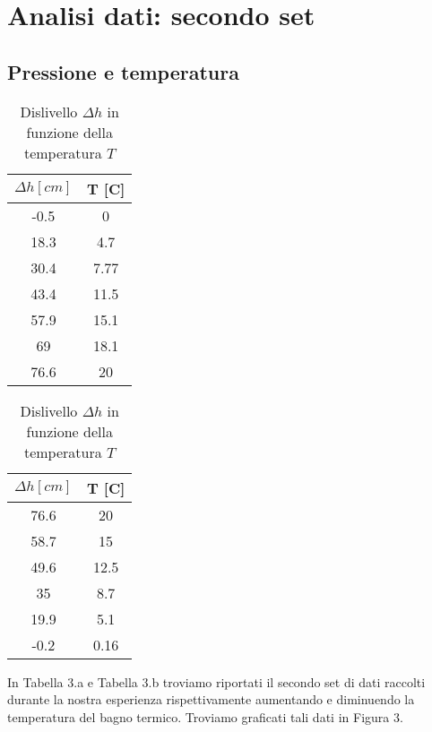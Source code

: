 \section{Analisi dati: secondo set}
\subsection{Pressione e temperatura}

\begin{table}[H]
\centering

	\begin{subtable}{.5\textwidth}
		\centering
		\begin{tabular}{|c|c|} \hline
			\textbf{$\Delta h {[cm]}$ } & \textbf{T {[\degree C]} }  \\ \hline
			-0.5 & 0  \\ \hline
			18.3 & 4.7  \\ \hline
			30.4 & 7.77  \\ \hline
			43.4 & 11.5  \\ \hline
			57.9 & 15.1  \\ \hline
			69 & 18.1  \\ \hline
			76.6 & 20  \\ \hline
		\end{tabular}
		\caption{Aumento della temperatura }
	\end{subtable}%
	\begin{subtable}{.5\textwidth}
	\centering
	\begin{tabular}{|c|c|} \hline
		\textbf{$\Delta h {[cm]}$ } & \textbf{T {[\degree C]} }  \\ \hline
		76.6 & 20  \\ \hline
		58.7 & 15  \\ \hline
		49.6 & 12.5  \\ \hline
		35 & 8.7  \\ \hline
		19.9 & 5.1  \\ \hline
		-0.2 & 0.16  \\ \hline
	\end{tabular}
	\caption{Diminuzione della temperatura }
\end{subtable}

\caption{Dislivello $\Delta h$ in funzione della temperatura $T$ }
\end{table}
In Tabella 3.a e Tabella 3.b troviamo riportati il secondo set di dati raccolti durante la nostra esperienza rispettivamente aumentando e diminuendo la temperatura del bagno termico.
Troviamo graficati tali dati in Figura 3. 

